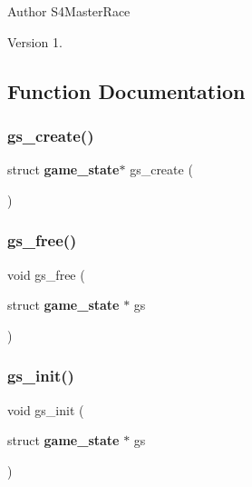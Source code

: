 \begin{DoxyAuthor}{Author}
S4\+Master\+Race 
\end{DoxyAuthor}
\begin{DoxyVersion}{Version}
1. 
\end{DoxyVersion}


\subsection{Function Documentation}
\mbox{\label{game__state_8c_a4981c5cc902057758e4bd907b9629cfd}} 
\subsubsection{gs\+\_\+create()}
{\footnotesize\ttfamily struct \textbf{ game\+\_\+state}$\ast$ gs\+\_\+create (\begin{DoxyParamCaption}{ }\end{DoxyParamCaption})}

\mbox{\label{game__state_8c_ac5fb586f3c5c1944e06cebb422811313}} 
\subsubsection{gs\+\_\+free()}
{\footnotesize\ttfamily void gs\+\_\+free (\begin{DoxyParamCaption}\item[{struct \textbf{ game\+\_\+state} $\ast$}]{gs }\end{DoxyParamCaption})\hspace{0.3cm}{\ttfamily [inline]}}

\mbox{\label{game__state_8c_af05255e813cc97e090bf3abcdb0348ce}} 
\subsubsection{gs\+\_\+init()}
{\footnotesize\ttfamily void gs\+\_\+init (\begin{DoxyParamCaption}\item[{struct \textbf{ game\+\_\+state} $\ast$}]{gs }\end{DoxyParamCaption})\hspace{0.3cm}{\ttfamily [inline]}}

